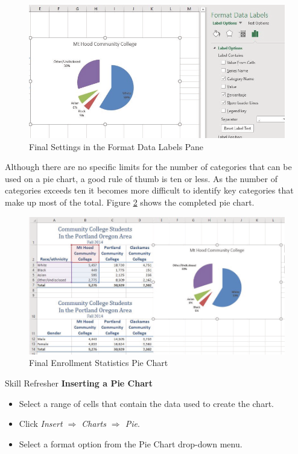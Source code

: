 \begin{figure}[H]
	\centering
	\includegraphics[width=\maxwidth{.95\linewidth}]{gfx/ch04_fig22}
	\caption{Final Settings in the Format Data Labels Pane}
	\label{04:fig22}
\end{figure}

Although there are no specific limits for the number of categories that can be used on a pie chart, a good rule of thumb is ten or less. As the number of  categories exceeds ten it becomes more difficult to identify key categories that make up most of the total. Figure \ref{04:fig23} shows the completed pie chart.

\begin{figure}[H]
	\centering
	\includegraphics[width=\maxwidth{.95\linewidth}]{gfx/ch04_fig23}
	\caption{Final Enrollment Statistics Pie Chart}
	\label{04:fig23}
\end{figure}

\begin{center}
	\begin{sklbox}{Skill Refresher}
		\textbf{Inserting a Pie Chart}
		\\
		\begin{itemize}
			\setlength{\itemsep}{0pt}
			\setlength{\parskip}{0pt}
			\setlength{\parsep}{0pt}

			\item Select a range of cells that contain the data used to create the chart.
			\item Click \textit{Insert $ \Rightarrow $ Charts $ \Rightarrow $ Pie}.
			\item Select a format option from the Pie Chart drop-down menu.
			
		\end{itemize}
	\end{sklbox}
\end{center}

